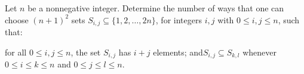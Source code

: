 Let $n$ be a nonnegative integer. Determine the number of ways that one can choose $(n+1)^2$ sets $S_{i,j}\subseteq\{1,2,\ldots,2n\}$,  for integers $i,j$ with $0\leq i,j\leq n$,  such that:

for all $0\leq i,j\leq n$,  the set $S_{i,j}$ has $i+j$ elements; and$S_{i,j}\subseteq S_{k,l}$ whenever $0\leq i\leq k\leq n$ and $0\leq j\leq l\leq n$.